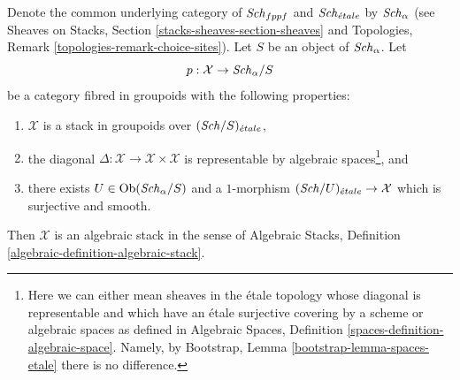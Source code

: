 \begin{lemma}
\label{lemma-stacks-etale}
Denote the common underlying category of $\mathit{Sch}_{fppf}$
and $\mathit{Sch}_{\acute{e}tale}$ by $\mathit{Sch}_\alpha$ (see
Sheaves on Stacks, Section \ref{stacks-sheaves-section-sheaves} and
Topologies, Remark \ref{topologies-remark-choice-sites}). Let $S$ be an object
of $\mathit{Sch}_\alpha$. Let
$$
p : \mathcal{X} \to \mathit{Sch}_\alpha/S
$$
be a category fibred in groupoids with the following properties:
\begin{enumerate}
\item $\mathcal{X}$ is a stack in groupoids over $(\mathit{Sch}/S)_{\acute{e}tale}$,
\item the diagonal $\Delta : \mathcal{X} \to \mathcal{X} \times \mathcal{X}$
is representable by algebraic spaces\footnote{Here we can either mean
sheaves in the \'etale topology whose diagonal is representable and which
have an \'etale surjective covering by a scheme or algebraic spaces as
defined in
Algebraic Spaces, Definition \ref{spaces-definition-algebraic-space}.
Namely, by Bootstrap, Lemma \ref{bootstrap-lemma-spaces-etale}
there is no difference.}, and
\item there exists $U \in \mathop{\mathrm{Ob}}\nolimits(\mathit{Sch}_\alpha/S)$
and a $1$-morphism $(\mathit{Sch}/U)_{\acute{e}tale} \to \mathcal{X}$
which is surjective and smooth.
\end{enumerate}
Then $\mathcal{X}$ is an algebraic stack in the sense of
Algebraic Stacks, Definition \ref{algebraic-definition-algebraic-stack}.
\end{lemma}


